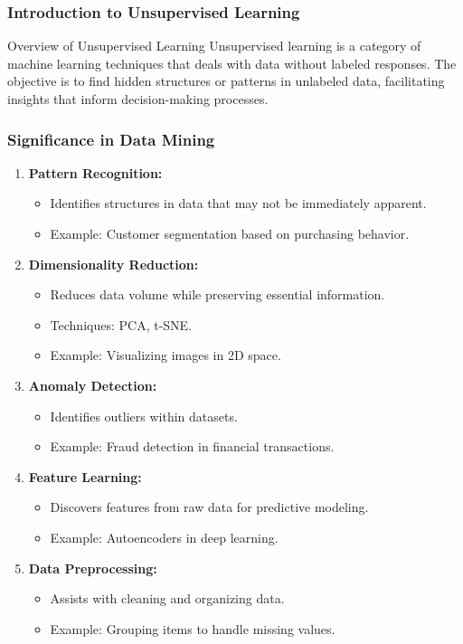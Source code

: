 \documentclass[aspectratio=169]{beamer}
\begin{document}
\frame{\titlepage}

\begin{frame}[fragile]
    \frametitle{Introduction to Unsupervised Learning}
    \begin{block}{Overview of Unsupervised Learning}
        Unsupervised learning is a category of machine learning techniques that deals with data without labeled responses. 
        The objective is to find hidden structures or patterns in unlabeled data, facilitating insights that inform decision-making processes.
    \end{block}
\end{frame}

\begin{frame}[fragile]
    \frametitle{Significance in Data Mining}
    \begin{enumerate}
        \item \textbf{Pattern Recognition:}
        \begin{itemize}
            \item Identifies structures in data that may not be immediately apparent.
            \item Example: Customer segmentation based on purchasing behavior.
        \end{itemize}

        \item \textbf{Dimensionality Reduction:}
        \begin{itemize}
            \item Reduces data volume while preserving essential information.
            \item Techniques: PCA, t-SNE.
            \item Example: Visualizing images in 2D space.
        \end{itemize}

        \item \textbf{Anomaly Detection:}
        \begin{itemize}
            \item Identifies outliers within datasets.
            \item Example: Fraud detection in financial transactions.
        \end{itemize}

        \item \textbf{Feature Learning:}
        \begin{itemize}
            \item Discovers features from raw data for predictive modeling.
            \item Example: Autoencoders in deep learning.
        \end{itemize}

        \item \textbf{Data Preprocessing:}
        \begin{itemize}
            \item Assists with cleaning and organizing data.
            \item Example: Grouping items to handle missing values.
        \end{itemize}
    \end{enumerate}
\end{frame}
\end{document}
